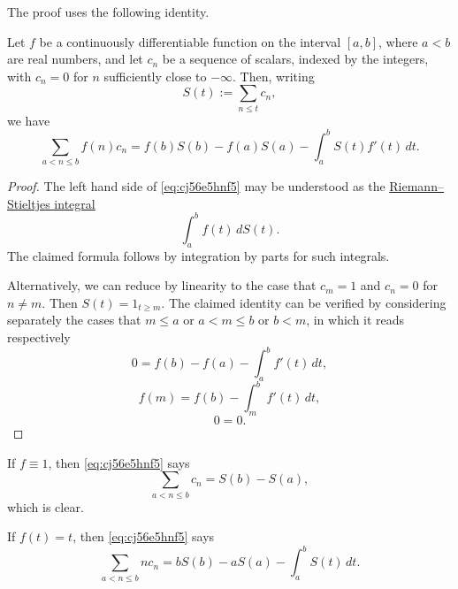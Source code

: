\documentclass[reqno]{amsart}  \numberwithin{theorem}{section} \numberwithin{equation}{section}
\begin{document}
The proof uses the following identity.
\begin{lemma}\label{lemma:cj56e5hp8x}
  Let $f$ be a continuously differentiable function on the interval $[a,b]$, where $a < b$ are real numbers, and let $c_n$ be a sequence of scalars, indexed by the integers, with $c_n = 0$ for $n$ sufficiently close to $-\infty$.  Then, writing
  \begin{equation*}
    S(t) := \sum_{n \leq t} c_n,
  \end{equation*}
  we have
  \begin{equation}\label{eq:cj56e5hnf5}
    \sum_{a < n  \leq b} f(n) c_n
    =
    f(b) S(b) - f(a) S(a)
    - \int_a^b S(t) f ' (t) \, d t.
  \end{equation}
\end{lemma}
\begin{proof}
  The left hand side of \eqref{eq:cj56e5hnf5} may be understood as the \href{https://en.wikipedia.org/wiki/Riemann%E2%80%93Stieltjes_integral}{Riemann--Stieltjes integral}
    \begin{equation*}
      \int_a^b f (t) \, d S(t).
    \end{equation*}
    The claimed formula follows by integration by parts for such integrals.

    Alternatively, we can reduce by linearity to the case that $c_m = 1$ and $c_n = 0$ for $n \neq m$.  Then $S(t) = 1_{t \geq m}$.  The claimed identity can be verified by considering separately the cases that $m \leq a$ or $a < m \leq b$ or $b < m$, in which it reads respectively
    \begin{equation*}
      0 = f(b) - f(a) - \int_a^b f'(t) \, d t,
    \end{equation*}
    \begin{equation*}
      f(m) = f(b) - \int_m^b f ' (t) \, d t,
    \end{equation*}
    \begin{equation*}
      0 = 0.
    \end{equation*}
\end{proof}
\begin{example}\label{example:cj56fa3yqw}
  If $f \equiv 1$, then \eqref{eq:cj56e5hnf5} says
  \begin{equation*}
    \sum_{a < n \leq b} c_n = S(b) - S(a),
  \end{equation*}
  which is clear.
\end{example}
\begin{example}\label{example:cj56fa31f5}
  If $f(t) = t$, then \eqref{eq:cj56e5hnf5} says
  \begin{equation*}
    \sum_{a < n \leq b} n c_n = b S(b) - a S(a) - \int_a^b S(t) \, d t.
  \end{equation*}
\end{example}
\end{document}
